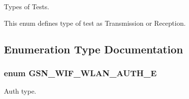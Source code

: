 Types of Tests. 

This enum defines type of test as Transmission or Reception. 

\subsection{Enumeration Type Documentation}
\hypertarget{a00677_ga2b3917a91d576d0d037c406e6397cab9}{
\subsubsection[{GSN\_\-WIF\_\-WLAN\_\-AUTH\_\-E}]{\setlength{\rightskip}{0pt plus 5cm}enum {\bf GSN\_\-WIF\_\-WLAN\_\-AUTH\_\-E}}}
\label{a00677_ga2b3917a91d576d0d037c406e6397cab9}


Auth type. 

